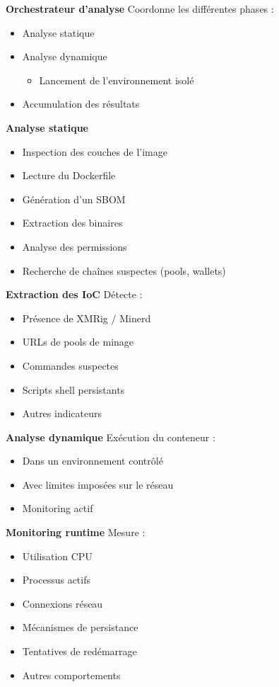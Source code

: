 \textbf{Orchestrateur d'analyse}
Coordonne les différentes phases :
\begin{itemize}
    \item Analyse statique
    \item Analyse dynamique
    \begin{itemize}
        \item Lancement de l'environnement isolé
    \end{itemize}
    \item Accumulation des résultats
\end{itemize}

\textbf{Analyse statique}
\begin{itemize}
    \item Inspection des couches de l'image
    \item Lecture du Dockerfile
    \item Génération d'un SBOM
    \item Extraction des binaires
    \item Analyse des permissions
    \item Recherche de chaînes suspectes (pools, wallets)
\end{itemize}

\textbf{Extraction des IoC}
Détecte :
\begin{itemize}
    \item Présence de XMRig / Minerd
    \item URLs de pools de minage
    \item Commandes suspectes
    \item Scripts shell persistants
    \item Autres indicateurs
\end{itemize}

\textbf{Analyse dynamique}
Exécution du conteneur :
\begin{itemize}
    \item Dans un environnement contrôlé
    \item Avec limites imposées sur le réseau
    \item Monitoring actif
\end{itemize}

\textbf{Monitoring runtime}
Mesure :
\begin{itemize}
    \item Utilisation CPU
    \item Processus actifs
    \item Connexions réseau
    \item Mécanismes de persistance
    \item Tentatives de redémarrage
    \item Autres comportements
\end{itemize}

